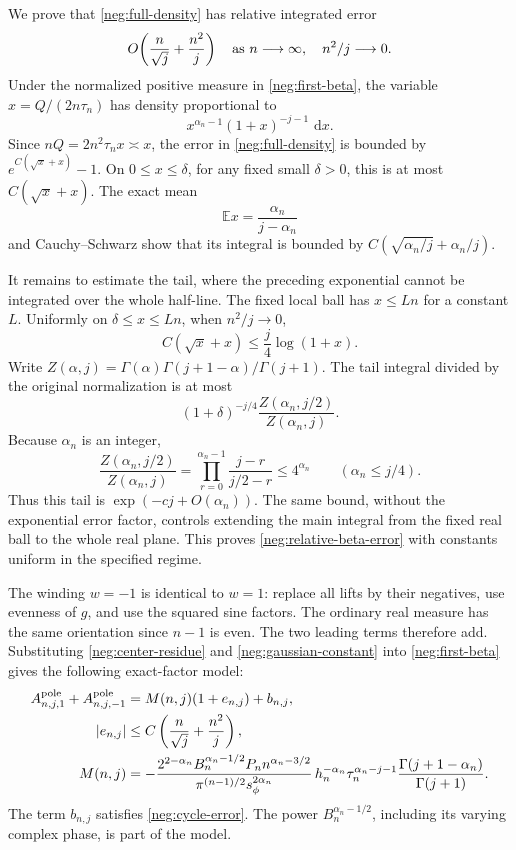 \documentclass[11pt]{article}
\numberwithin{equation}{section}
\theoremstyle{definition}
\newcommand{\dd}{\,\mathrm d}
\begin{document}
We prove that \eqref{neg:full-density} has relative integrated
error
\begin{equation}
 O\!\left(\frac n{\sqrt j}+\frac{n^2}{j}\right)
 \quad\hbox{as }n\longrightarrow\infty,\quad n^2/j\longrightarrow0.
 \label{neg:relative-beta-error}
\end{equation}
Under the normalized positive measure in
\eqref{neg:first-beta}, the variable
\(x=Q/(2n\tau_n)\) has density proportional to
\[
 x^{\alpha_n-1}(1+x)^{-j-1}\,\dd x .
 \]
Since \(nQ=2n^2\tau_n x\asymp x\),
the error in \eqref{neg:full-density} is bounded by
\(e^{C(\sqrt x+x)}-1\).  On \(0\le x\le\delta\), for any
fixed small \(\delta>0\), this is at most \(C(\sqrt x+x)\).
The exact mean
\[
 \mathbb E x=\frac{\alpha_n}{j-\alpha_n}
 \]
and Cauchy--Schwarz show that its integral is bounded by
\(C(\sqrt{\alpha_n/j}+\alpha_n/j)\).

It remains to estimate the tail, where the preceding exponential
cannot be integrated over the whole half-line.  The fixed local
ball has \(x\le Ln\) for a constant \(L\).
Uniformly on \(\delta\le x\le Ln\), when \(n^2/j\to0\),
\[
 C(\sqrt x+x)\le\frac j4\log(1+x).
 \]
Write
\(Z(\alpha,j)=\Gamma(\alpha)\Gamma(j+1-\alpha)/\Gamma(j+1)\).
The tail integral divided by the original normalization is
at most
\[
 (1+\delta)^{-j/4}
       \frac{Z(\alpha_n,j/2)}{Z(\alpha_n,j)}.
 \]
Because \(\alpha_n\) is an integer,
\[
 \frac{Z(\alpha_n,j/2)}{Z(\alpha_n,j)}
 =\prod_{r=0}^{\alpha_n-1}
        \frac{j-r}{j/2-r}\le4^{\alpha_n}
                  \qquad(\alpha_n\le j/4).
 \]
Thus this tail is \(\exp(-cj+O(\alpha_n))\).
The same bound, without the exponential error factor,
controls extending the main integral from the fixed real
ball to the whole real plane.  This proves
\eqref{neg:relative-beta-error} with constants uniform in
the specified regime.

The winding \(w=-1\) is identical to \(w=1\): replace all
lifts by their negatives, use evenness of \(g\), and use the
squared sine factors.  The ordinary real measure has the same
orientation since \(n-1\) is even.  The two leading terms
therefore add.  Substituting \eqref{neg:center-residue} and
\eqref{neg:gaussian-constant} into \eqref{neg:first-beta}
gives the following exact-factor model:
\begin{align}
 A^{\rm pole}_{n,j,1}+A^{\rm pole}_{n,j,-1}
 &=M(n,j)(1+e_{n,j})+b_{n,j},
 \label{neg:local-model}\\
 |e_{n,j}|&\le C\left(\frac n{\sqrt j}+\frac{n^2}{j}\right),
 \label{neg:local-error}\\
 M(n,j)&=
 -\frac{2^{2-\alpha_n}B_n^{\alpha_n-1/2}P_n
                         n^{\alpha_n-3/2}}
        {\pi^{(n-1)/2}s_\phi^{2\alpha_n}}\,
 h_n^{-\alpha_n}\tau_n^{\alpha_n-j-1}
       \frac{\Gamma(j+1-\alpha_n)}{\Gamma(j+1)} .
 \label{neg:model}
\end{align}
The term \(b_{n,j}\) satisfies \eqref{neg:cycle-error}.
The power \(B_n^{\alpha_n-1/2}\), including its varying
complex phase, is part of the model.
\end{document}

